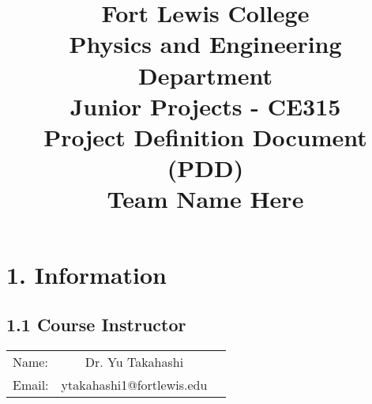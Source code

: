 \documentclass{article}
\date{}
\title{Fort Lewis College\\
Physics and Engineering Department\\
Junior Projects - CE315\\
\vspace{.5cm}
Project Definition Document (PDD)\\
\vspace{.5cm}
\textbf{Team Name Here}}
\begin{document}
\vspace{-5cm}
\maketitle
\vspace{-2cm}


\section*{1. Information}

\subsection*{1.1 Course Instructor}
\vspace{-.5cm}
\begin{table}[h!]
\centering
\begin{tabular}{|lc|l}
\hline
Name:  & Dr. Yu Takahashi  \\
Email: & ytakahashi1@fortlewis.edu \\\hline
\end{tabular}
\end{table}
\end{document}
